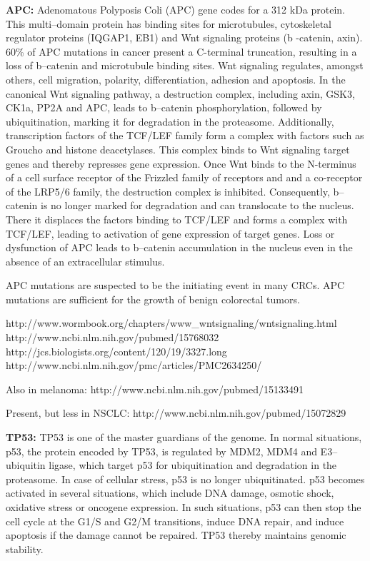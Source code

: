       \textbf{APC:} Adenomatous Polyposis Coli (APC) gene codes for a 312 kDa
      protein. This multi--domain protein has binding sites for microtubules,
      cytoskeletal regulator proteins (IQGAP1, EB1) and Wnt signaling proteins
      (b -catenin, axin). 60\% of APC mutations in cancer present a
      C-terminal truncation, resulting in a loss of b--catenin and
      microtubule binding sites. Wnt signaling regulates, amongst others, cell
      migration, polarity, differentiation, adhesion and apoptosis. In the
      canonical Wnt signaling pathway, a destruction complex, including axin,
      GSK3, CK1a, PP2A and APC, leads to b--catenin phosphorylation,
      followed by ubiquitination, marking it for degradation in the proteasome.
      Additionally, transcription factors of the TCF/LEF family form a complex
      with factors such as Groucho and histone deacetylases. This complex binds
      to Wnt signaling target genes and thereby represses gene expression. Once
      Wnt binds to the N-terminus of a cell surface receptor of the Frizzled
      family of receptors and and a co-receptor of the LRP5/6 family, the
      destruction complex is inhibited. Consequently, b--catenin is no
      longer marked for degradation and can translocate to the nucleus. There it
      displaces the factors binding to TCF/LEF and forms a complex with TCF/LEF,
      leading to activation of gene expression of target genes. Loss or
      dysfunction of APC leads to b--catenin accumulation in the nucleus
      even in the absence of  an extracellular stimulus.

      APC mutations are suspected to be the initiating event in many CRCs. APC
      mutations are sufficient for the growth of benign colorectal tumors.

      http://www.wormbook.org/chapters/www_wntsignaling/wntsignaling.html
      http://www.ncbi.nlm.nih.gov/pubmed/15768032
      http://jcs.biologists.org/content/120/19/3327.long
      http://www.ncbi.nlm.nih.gov/pmc/articles/PMC2634250/

      Also in melanoma: http://www.ncbi.nlm.nih.gov/pubmed/15133491

      Present, but less in NSCLC: http://www.ncbi.nlm.nih.gov/pubmed/15072829

      \textbf{TP53:} TP53 is one of the master guardians of the genome. In
      normal situations, p53, the protein encoded by TP53, is regulated by MDM2,
      MDM4 and E3--ubiquitin ligase, which target p53 for ubiquitination and
      degradation in the proteasome. In case of cellular stress, p53 is no
      longer ubiquitinated. p53 becomes activated in several situations, which
      include  DNA damage, osmotic shock, oxidative stress or oncogene
      expression. In such situations, p53 can then stop the cell cycle at the
      G1/S and G2/M transitions, induce DNA repair, and induce apoptosis if the
      damage cannot be repaired. TP53 thereby maintains genomic stability.

